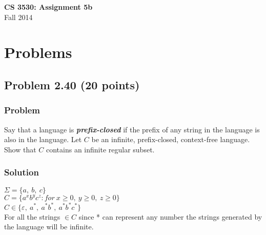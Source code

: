 \documentclass{article}
\begin{document}
\begin{empfile}

\begin{center}
\textbf{\Large CS 3530: Assignment 5b} \\[2mm]
Fall 2014
\end{center}

\raggedright

\section*{Problems}

\subsection*{Problem 2.40 (20 points)}

\subsubsection*{Problem}

Say that a language is \textit{\textbf{prefix-closed}} if the prefix
of any string in the language is also in the language. Let $C$ be an
infinite, prefix-closed, context-free language. Show that $C$
contains an infinite regular subset.

\subsubsection*{Solution}

$\Sigma = \{a,\ b,\ c\}$ \\
$C = \{a^xb^yc^z: for\ x \ge 0,\ y \ge 0,\ z \ge 0\}$ \\
$C \in \{ \varepsilon,\ a^*,\ a^*b^*,\ a^*b^*c^* \}$ \\ 
$\ $ \\
For all the strings $\in C$ since * can represent any number 
the strings generated by the language will be infinite.


\end{empfile}
\immediate{}
\end{document}
